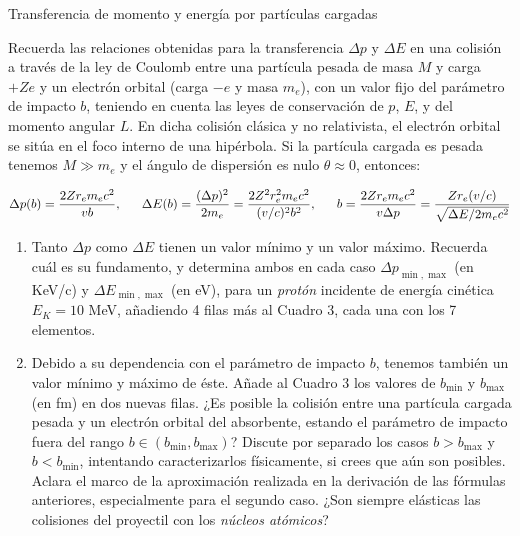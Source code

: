 \begin{Ejercicio}{Transferencia de momento y energía por partículas cargadas} \label{Ej:02.03}

Recuerda las relaciones obtenidas para la transferencia $\Delta p$ y $\Delta E$ en una colisión a través de la ley de Coulomb entre una partícula pesada de masa $M$ y carga $+Ze$ y un electrón orbital (carga $-e$ y masa $m_e$), con un valor fijo del parámetro de impacto $b$, teniendo en cuenta las leyes de conservación de $p$, $E$, y del momento angular $L$. En dicha colisión clásica y no relativista, el electrón orbital se sitúa en el foco interno de una hipérbola. Si la partícula cargada es pesada tenemos $M \gg m_e$ y el ángulo de dispersión es nulo $\theta \approx 0$, entonces:

\[ \scriptsize
\Delta p(b) = \frac{2 Z r_e m_e c^2}{v b}, \qquad 
\Delta E(b) = \frac{(\Delta p)^2}{2 m_e} = \frac{2 Z^2 r_e^2 m_e c^2}{(v/c)^2 b^2}, \qquad
b = \frac{2 Z r_e m_e c^2}{v \Delta p} = \frac{Z r_e (v/c)}{\sqrt{\Delta E / 2 m_e c^2 }}
\]

\begin{enumerate}[label=\alph*)]
\item Tanto $\Delta p$ como $\Delta E$ tienen un valor mínimo y un valor máximo. Recuerda cuál es su fundamento, y determina ambos en cada caso $\Delta p_{\min,\max}$ (en KeV/c) y $\Delta E_{\min,\max}$ (en eV), para un \emph{protón} incidente de energía cinética $E_K = 10$ MeV, añadiendo 4 filas más al Cuadro 3, cada una con los 7 elementos.

\item  Debido a su dependencia con el parámetro de impacto $b$, tenemos también un valor mínimo y máximo de éste. Añade al Cuadro 3 los valores de $b_{\min}$ y $b_{\max}$ (en fm) en dos nuevas filas. ¿Es posible la colisión entre una partícula cargada pesada y un electrón orbital del absorbente, estando el parámetro de impacto fuera del rango $b \in (b_{\min}, b_{\max})$? Discute por separado los casos $b > b_{\max}$ y $b < b_{\min}$, intentando caracterizarlos físicamente, si crees que aún son posibles. Aclara el marco de la aproximación realizada en la derivación de las fórmulas anteriores, especialmente para el segundo caso. ¿Son siempre elásticas las colisiones del proyectil con los \emph{núcleos atómicos}? \\[1em]
\end{enumerate}


\end{Ejercicio}
